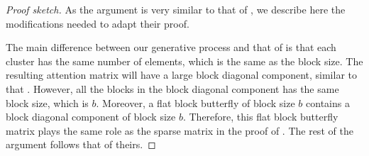 \begin{proof}[Proof sketch]
  As the argument is very similar to that of \citet[Theorem 1]{scatterbrain}, we
  describe here the modifications needed to adapt their proof.

  The main difference between our generative process and that of
  \citet{scatterbrain} is that each cluster has the same number of elements,
  which is the same as the block size.
  The resulting attention matrix will have a large block diagonal component,
  similar to that \citet{scatterbrain}.
  However, all the blocks in the block diagonal component has the same block
  size, which is $b$.
  Moreover, a flat block butterfly of block size $b$ contains a block diagonal
  component of block size $b$.
  Therefore, this flat block butterfly matrix plays the same role as the sparse
  matrix in the proof of \citet{scatterbrain}.
  The rest of the argument follows that of theirs.
\end{proof}

